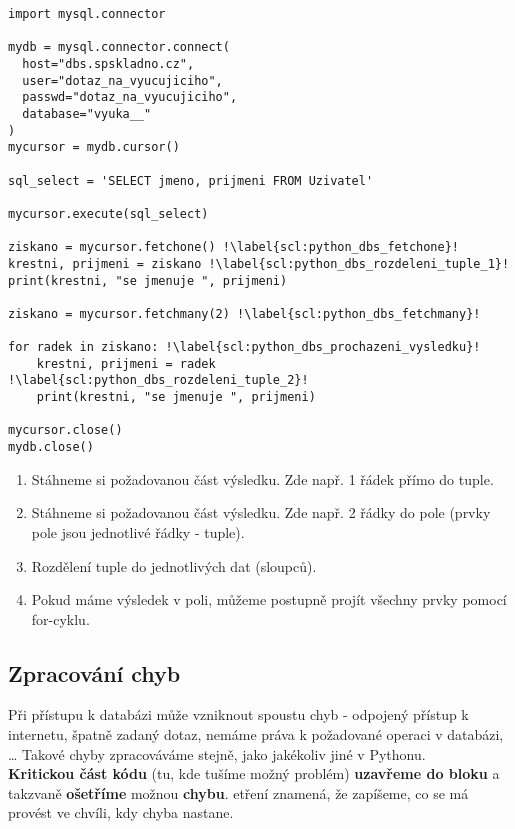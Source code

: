 \begin{minipage}[t]{.45\textwidth}
\begin{code}
\begin{verbatim}
import mysql.connector 

mydb = mysql.connector.connect( 
  host="dbs.spskladno.cz",
  user="dotaz_na_vyucujiciho",
  passwd="dotaz_na_vyucujiciho",
  database="vyuka__"
)
mycursor = mydb.cursor() 

sql_select = 'SELECT jmeno, prijmeni FROM Uzivatel'

mycursor.execute(sql_select) 

ziskano = mycursor.fetchone() !\label{scl:python_dbs_fetchone}!
krestni, prijmeni = ziskano !\label{scl:python_dbs_rozdeleni_tuple_1}!
print(krestni, "se jmenuje ", prijmeni)

ziskano = mycursor.fetchmany(2) !\label{scl:python_dbs_fetchmany}!

for radek in ziskano: !\label{scl:python_dbs_prochazeni_vysledku}!
	krestni, prijmeni = radek !\label{scl:python_dbs_rozdeleni_tuple_2}!
	print(krestni, "se jmenuje ", prijmeni)

mycursor.close() 
mydb.close()
\end{verbatim}

\label{code:python_dbs_select}
\end{code}
\end{minipage}
\begin{minipage}[t]{.45\textwidth}
\begin{enumerate}
\item[ř. \ref{scl:python_dbs_fetchone}:] Stáhneme si požadovanou část výsledku. Zde např. 1 řádek přímo do tuple.
\item[ř. \ref{scl:python_dbs_fetchmany}:] Stáhneme si požadovanou část výsledku. Zde např. 2 řádky do pole (prvky pole jsou jednotlivé řádky - tuple).
\item[ř. \ref{scl:python_dbs_rozdeleni_tuple_1}, \ref{scl:python_dbs_rozdeleni_tuple_2}:] Rozdělení tuple do jednotlivých dat (sloupců).
\vspace{0.5cm}
\item[ř. \ref{scl:python_dbs_prochazeni_vysledku}:] Pokud máme výsledek v poli, můžeme postupně projít všechny prvky pomocí for-cyklu.
\end{enumerate}
\end{minipage}

\subsection{Zpracování chyb}
Při přístupu k databázi může vzniknout spoustu chyb - odpojený přístup k internetu, špatně zadaný dotaz, nemáme práva k požadované operaci v databázi, \dots 
Takové chyby zpracováváme stejně, jako jakékoliv jiné  v Pythonu.\\ 
\textbf{Kritickou část kódu} (tu, kde tušíme možný problém) \textbf{uzavřeme do bloku } a takzvaně \textbf{ošetříme} možnou \textbf{chybu}. etření znamená, že zapíšeme, co se má provést ve chvíli, kdy chyba nastane.


